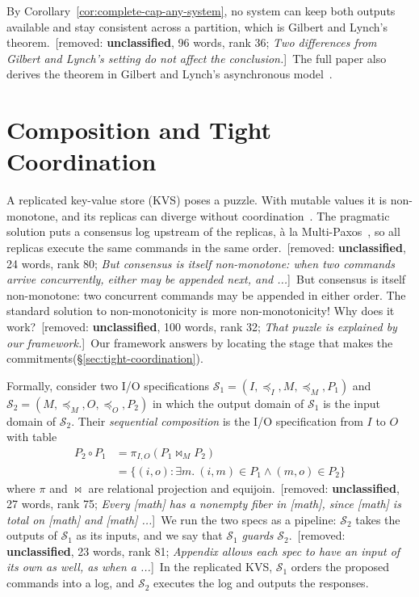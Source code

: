 \documentclass[sigconf]{cidr-2027}
\theoremstyle{remark}
\newcommand{\InputOrd}{\preceq_I}
\newcommand{\OutputOrd}{\preceq_O}
\newcommand{\commitments}{commitments\xspace}
\newcommand{\Spec}{\mathcal{S}}
\newcommand{\spectype}[1][]{I/O specification#1\xspace}
\newcommand{\removednote}[1]{{\color{cutred}\footnotesize\,[removed: #1]\,}}
\begin{document}
By Corollary~\ref{cor:complete-cap-any-system}, no system can keep both outputs
available and stay consistent across a partition, which is Gilbert and Lynch's
theorem. \removednote{\textbf{unclassified}, 96 words, rank 36; \textit{Two differences from Gilbert and Lynch's setting do not affect the conclusion.}} \textcolor{newblue}{The full paper also derives the theorem in Gilbert and Lynch's asynchronous
model~\cite{hellerstein2026completecalmfull}.}


\section{Composition and Tight Coordination}
\label{sec:composition}

\textcolor{newblue}{A replicated key-value store (KVS) poses a puzzle.} \textcolor{newblue}{With mutable values it is
non-monotone, and its replicas can diverge without
coordination~\cite{alvaro2011bloom}.} \textcolor{newblue}{The pragmatic solution puts a consensus
log upstream of the replicas, \`a la Multi-Paxos~\cite{lamport2001paxos}, so
all replicas execute the same commands in the same order.} \removednote{\textbf{unclassified}, 24 words, rank 80; \textit{But consensus is itself non-monotone: when two commands arrive concurrently, either may be appended next, and ...}} \textcolor{newblue}{But consensus is
itself non-monotone: two concurrent commands may be appended in either order.} \textcolor{newblue}{The standard solution to non-monotonicity is more non-monotonicity!} Why does
it work? \removednote{\textbf{unclassified}, 100 words, rank 32; \textit{That puzzle is explained by our framework.}} \textcolor{newblue}{Our framework answers by locating the stage that makes the
\commitments (\S\ref{sec:tight-coordination}).}
\label{sec:sequential-composition}

Formally, consider two \spectype[s]
${\Spec_1=(I,\InputOrd,M,\preceq_M,P_1)}$ and
${\Spec_2=(M,\preceq_M,O,\OutputOrd,P_2)}$
in which the output domain of $\Spec_1$ is the input domain of $\Spec_2$. Their
\emph{sequential composition} is the \spectype from $I$ to $O$ with table
\begin{equation}
\begin{split}
  P_2\circ P_1
  &=\pi_{I,O}(P_1\Join_M P_2)\\
  &=\{(i,o):\exists m.\ (i,m)\in P_1\land(m,o)\in P_2\}
\end{split}
  \label{eq:spec-composition}
\end{equation}
where $\pi$ and $\Join$ are relational projection and equijoin. \removednote{\textbf{unclassified}, 27 words, rank 75; \textit{Every [math] has a nonempty fiber in [math], since [math] is total on [math] and [math] ...}} We run the two specs as a pipeline: $\Spec_2$ takes the outputs of $\Spec_1$ as
its inputs, and we say that $\Spec_1$ \emph{guards} $\Spec_2$. \removednote{\textbf{unclassified}, 23 words, rank 81; \textit{Appendix allows each spec to have an input of its own as well, as when a ...}} \textcolor{newblue}{In the replicated
KVS, $\Spec_1$ orders the proposed commands into a log, and $\Spec_2$
executes the log and outputs the responses.}
\end{document}
